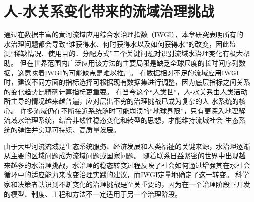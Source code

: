 \section{人-水关系变化带来的流域治理挑战}

通过在数据丰富的黄河流域应用综合水治理指数（IWGI），本章研究表明所有的水治理问题都会导致“谁获得水、何时获得水以及如何获得水”的改变，因此监测“稀缺情况、使用目的、分配方式”三个关键问题对识别流域水治理变化有极大帮助。
但在世界范围内广泛应用该方法的主要局限是缺乏全球尺度的长时间序列数据，这意味着IWGI的可能缺点是难以推广。
在数据相对不足的流域应用IWGI时，建议不同方面的指标选择可根据现有数据集进行调整，因为底层指标之间关系的变化趋势比精确计算指标更重要。
在当今这个“人类世”，人-水关系由人类活动所主导的情况越来越普遍，应对层出不穷的治理挑战已成为复杂的人-水系统的核心\cite{cumming2018,cumming2014,jaeger2019}。
许多流域仍在不断接近系统随时可能崩溃的“地球界限”\cite{gleeson2020, wang-erlandsson2022}，只有更深入地理解流域水治理系统，结合非线性稳态变化和转型的思想，才能维持流域社会-生态系统的弹性并实现可持续、高质量发展\cite{falkenmark2019}。

由于大型河流流域是生态系统服务、经济发展和人类福祉的关键来源，水治理逐渐从主要的区域问题成为流域问题或国家问题\cite{best2019,best2020}。
随着联系日益紧密的世界中出现越来越多的水治理挑战，水治理的稳态转变过程反映了社会如何通过增强其在水社会循环中的适应能力来改变治理实践的建议，而IWGI定量地确定了这一转变\cite{loch2020,turton1999,diaz2019}。
科学家和决策者认识到不断变化的治理挑战是至关重要的，因为在一个治理阶段下开发的模型、制度、工程和方法不一定适用于另一个治理阶段\cite{reyers2018}。

